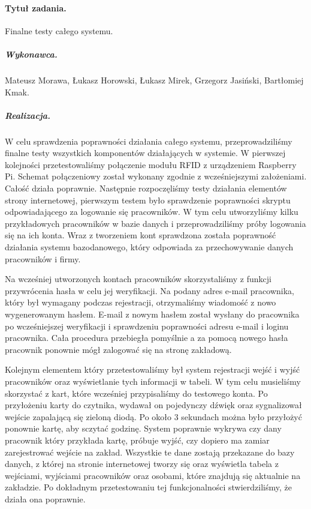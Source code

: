 \documentclass[a4paper]{article}
\begin{document}
\paragraph{Tytuł zadania.} Finalne testy całego systemu.
\subparagraph{Wykonawca.} Mateusz Morawa, Łukasz Horowski, Łukasz Mirek, Grzegorz Jasiński, Bartłomiej Kmak.
\subparagraph{Realizacja.} 
W celu sprawdzenia poprawności działania całego systemu, przeprowadziliśmy finalne testy wszystkich komponentów działających w systemie. W pierwszej kolejności przetestowaliśmy połączenie modułu RFID z urządzeniem Raspberry Pi. Schemat połączeniowy został wykonany zgodnie z wcześniejszymi założeniami. Całość działa poprawnie. Następnie rozpoczęliśmy testy działania elementów strony internetowej, pierwszym testem było sprawdzenie poprawności skryptu odpowiadającego za logowanie się pracowników. W tym celu utworzyliśmy kilku przykładowych pracowników w bazie danych i przeprowadziliśmy próby logowania się na ich konta. Wraz z tworzeniem kont sprawdzona została poprawność działania systemu bazodanowego, który odpowiada za przechowywanie danych pracowników i firmy.

Na wcześniej utworzonych kontach pracowników skorzystaliśmy z funkcji przywrócenia hasła w celu jej weryfikacji. Na podany adres e-mail pracownika, który był wymagany podczas rejestracji, otrzymaliśmy wiadomość z nowo wygenerowanym hasłem. E-mail z nowym hasłem został wysłany do pracownika po wcześniejszej weryfikacji i sprawdzeniu poprawności adresu e-mail i loginu pracownika. Cała procedura przebiegła pomyślnie a za pomocą nowego hasła pracownik ponownie mógł zalogować się na stronę zakładową.

Kolejnym elementem który przetestowaliśmy był system rejestracji wejść i wyjść pracowników oraz wyświetlanie tych informacji w tabeli. W tym celu musieliśmy skorzystać z kart, które wcześniej przypisaliśmy do testowego konta. Po przyłożeniu karty do czytnika, wydawał on pojedynczy dźwięk oraz sygnalizował wejście zapalającą się zieloną diodą. Po około 3 sekundach można było przyłożyć ponownie kartę, aby sczytać godzinę. System poprawnie wykrywa czy dany pracownik który przykłada kartę, próbuje wyjść, czy dopiero ma zamiar zarejestrować wejście na zakład. Wszystkie te dane zostają przekazane do bazy danych, z której na stronie internetowej tworzy się oraz wyświetla tabela z wejściami, wyjściami pracowników oraz osobami, które znajdują się aktualnie na zakładzie. Po dokładnym przetestowaniu tej funkcjonalności stwierdziliśmy, że działa ona poprawnie.
\end{document}
